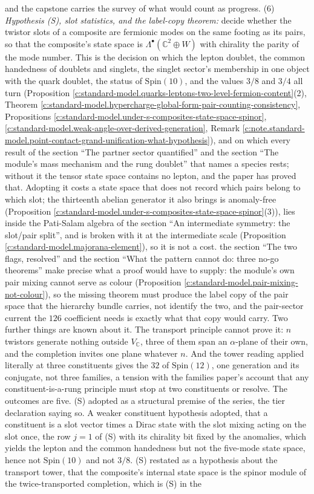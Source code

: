 \documentclass[11pt]{article}
\theoremstyle{definition}
\theoremstyle{plain}
\providecommand{\C}{}\renewcommand{\C}{\mathbb{C}}
\begin{document}
and the capstone carries the survey of what would count as progress. (6) \emph{Hypothesis (S), slot statistics, and the label-copy theorem:} decide whether the twistor slots of a composite are fermionic modes on the same footing as its pairs, so that the composite's state space is $\Lambda^{\bullet}(\C^{2} \oplus W)$ with chirality the parity of the mode number. This is the decision on which the lepton doublet, the common handedness of doublets and singlets, the singlet sector's membership in one object with the quark doublet, the status of $\mathrm{Spin}(10)$, and the values $3/8$ and $3/4$ all turn (Proposition \ref{c:standard-model.quarks-leptons-two-level-fermion-content}(2), Theorem \ref{c:standard-model.hypercharge-global-form-pair-counting-consistency}, Propositions \ref{c:standard-model.under-s-composites-state-space-spinor}, \ref{c:standard-model.weak-angle-over-derived-generation}, Remark \ref{c:note.standard-model.point-contact-grand-unification-what-hypothesis}), and on which every result of the section ``The partner sector quantified'' and the section ``The module's mass mechanism and the rung doublet'' that names a species rests; without it the tensor state space contains no lepton, and the paper has proved that. Adopting it costs a state space that does not record which pairs belong to which slot; the thirteenth abelian generator it also brings is anomaly-free (Proposition \ref{c:standard-model.under-s-composites-state-space-spinor}(3)), lies inside the Pati-Salam algebra of the section ``An intermediate symmetry: the slot/pair split'', and is broken with it at the intermediate scale (Proposition \ref{c:standard-model.majorana-element}), so it is not a cost. the section ``The two flags, resolved'' and the section ``What the pattern cannot do: three no-go theorems'' make precise what a proof would have to supply: the module's own pair mixing cannot serve as colour (Proposition \ref{c:standard-model.pair-mixing-not-colour}), so the missing theorem must produce the label copy of the pair space that the hierarchy bundle carries, not identify the two, and the pair-sector current the $126$ coefficient needs is exactly what that copy would carry. Two further things are known about it. The transport principle cannot prove it: $n$ twistors generate nothing outside $V_{\C}$, three of them span an $\alpha$-plane of their own, and the completion invites one plane whatever $n$. And the tower reading applied literally at three constituents gives the $32$ of $\mathrm{Spin}(12)$, one generation and its conjugate, not three families, a tension with the families paper's account that any constituent-is-a-rung principle must stop at two constituents or resolve. The outcomes are five. (S) adopted as a structural premise of the series, the tier declaration saying so. A weaker constituent hypothesis adopted, that a constituent is a slot vector times a Dirac state with the slot mixing acting on the slot once, the row $j = 1$ of (S) with its chirality bit fixed by the anomalies, which yields the lepton and the common handedness but not the five-mode state space, hence not $\mathrm{Spin}(10)$ and not $3/8$. (S) restated as a hypothesis about the transport tower, that the composite's internal state space is the spinor module of the twice-transported completion, which is (S) in the 
\end{document}
